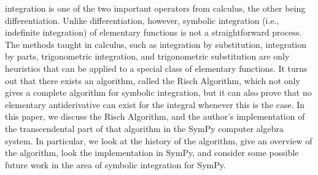 \Gls{integration} is one of the two important operators from \gls{calculus},
the other being \gls{differentiation}.  Unlike \gls{differentiation},
however, symbolic \gls{integration} (i.e., indefinite \gls{integration})
of \gls{elementary} functions is not a straightforward process. The
methods taught in \gls{calculus}, such as \gls{integration} by substitution,
\gls{integration} by parts, trigonometric \gls{integration}, and
trigonometric substitution are only heuristics that can be applied to a
special class of \gls{elementary} functions. It turns out that there
exists an algorithm, called the Risch Algorithm, which not only gives a
complete algorithm for symbolic \gls{integration}, but it can also prove
that no \gls{elementary} antiderivative can exist for the integral
whenever this is the case. In this paper, we discuss the Risch
Algorithm, and the author's implementation of the \gls{transcendental}
part of that algorithm in the SymPy computer algebra system.  In
particular, we look at the history of the algorithm, give an overview of
the algorithm, look the implementation in SymPy, and consider some
possible future work in the area of symbolic \gls{integration} for
SymPy.
